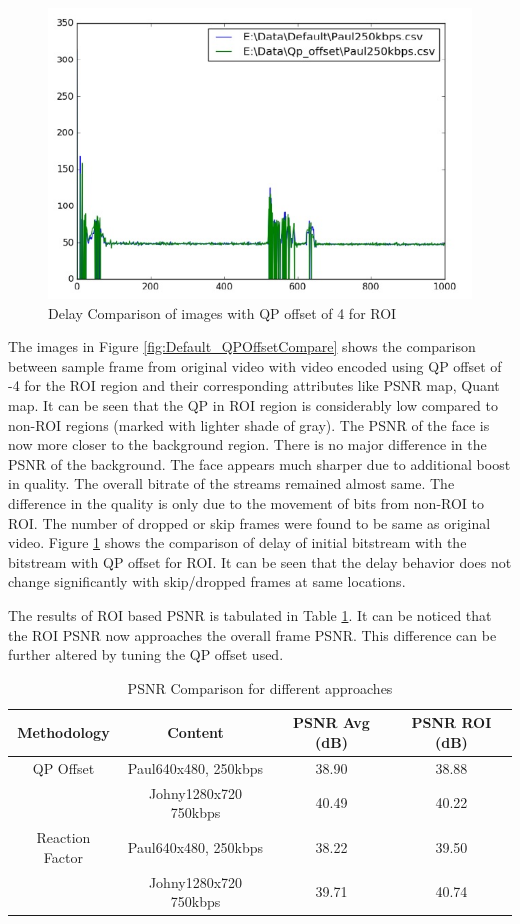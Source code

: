 \documentclass[11pt]{article} %
\begin{document}
\begin{figure}[!h]
    \centering
    \includegraphics[scale=0.75]{QPOffset/Paul250kbps_QP_Offset_Delay}
    \caption{Delay Comparison of images with QP offset of 4 for ROI}
    \label{fig:DelayDefault_QPOffsetCompare}
\end{figure}

The images in Figure \ref{fig:Default_QPOffsetCompare} shows the comparison between sample frame from original video with video encoded using QP offset of -4 for the ROI region and their corresponding attributes like PSNR map, Quant map. It can be seen that the QP in ROI region is considerably low compared to non-ROI regions (marked with lighter shade of gray). The PSNR of the face is now more closer to the background region. There is no major difference in the PSNR of the background. The face appears much sharper due to additional boost in quality. The overall bitrate of the streams remained almost same. The difference in the quality is only due to the movement of bits from non-ROI to ROI. The number of dropped or skip frames were found to be same as original video. Figure \ref{fig:DelayDefault_QPOffsetCompare} shows the comparison of delay of initial bitstream with the bitstream with QP offset for ROI. It can be seen that the delay behavior does not change significantly with skip/dropped frames at same locations.

The results of ROI based PSNR is tabulated in Table \ref{AllPSNR1}. It can be noticed that the ROI PSNR now approaches the overall frame PSNR. This difference can be further altered by tuning the QP offset used.
\begin{table} [h!]
\centering
\begin{tabular}{ |c|c|c|c| }
 \hline
Methodology & Content & PSNR Avg (dB) & PSNR ROI (dB) \\
 \hline 
QP Offset & Paul640x480, 250kbps & 38.90 & 38.88 \\ 
 & Johny1280x720 750kbps & 40.49 & 40.22 \\  
 \hline
Reaction Factor & Paul640x480, 250kbps & 38.22 & 39.50 \\ 
 & Johny1280x720 750kbps & 39.71 & 40.74 \\  
 \hline
\end{tabular}
 \caption{PSNR Comparison for different approaches}
 \label{AllPSNR1}
\end{table}
\end{document}
